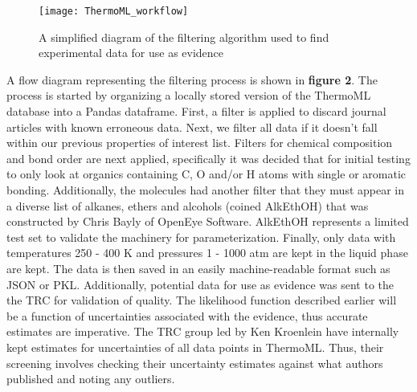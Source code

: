 \documentclass[rmp,nofootinbib,superscriptaddress,12pt,tightenlines,notitlepage]{revtex4-1}
\begin{document}
\begin{wrapfigure}[15]{r}{0.5\textwidth}
 \centering
 \texttt{[image: ThermoML\_workflow]}
 \caption{A simplified diagram of the filtering algorithm used to find experimental data for use as evidence}
\end{wrapfigure}
A flow diagram representing the filtering process is shown in \textbf{figure 2}. The process is started by organizing a locally stored version of the 
ThermoML database into a Pandas dataframe. First, a filter is applied to discard journal articles with known erroneous data. Next, we filter all data if it doesn't 
fall within our previous properties of interest list. Filters for chemical composition and bond order are next applied, specifically it was decided that for initial 
testing to only look at organics containing C, O and/or H atoms with single or aromatic bonding. Additionally, the molecules had another filter that they must appear
in a diverse list of alkanes, ethers and alcohols (coined AlkEthOH) that was constructed by Chris Bayly of OpenEye Software. AlkEthOH represents a limited test set
to validate the machinery for parameterization. Finally, only data with temperatures  
250 - 400 K and pressures 1 - 1000 atm are kept in the liquid phase are kept. The data is then saved in an easily machine-readable format such as JSON or PKL. Additionally, potential data 
for use as evidence was sent to the the TRC for validation of quality. The likelihood function described earlier will be a function of uncertainties associated
with the evidence, thus accurate estimates are imperative. The TRC group led by Ken Kroenlein have internally kept estimates for uncertainties of all data points
in ThermoML. Thus, their screening involves checking their uncertainty estimates against what authors published and noting any outliers. 
\end{document}
